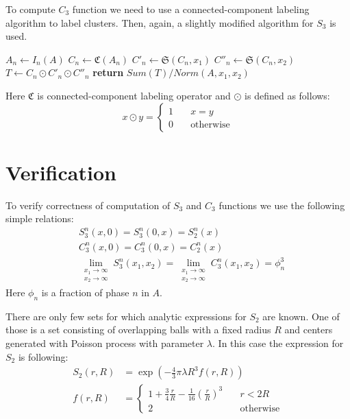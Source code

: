 \documentclass[1p]{elsarticle}
\begin{document}
To compute $C_3$ function we need to use a connected-component labeling
algorithm \cite{4728561,PhysRevB.14.3438} to label clusters. Then, again, a
slightly modified algorithm for $S_3$ is used.
\begin{algorithmic}[1]
  \State $A_n \gets I_n (A)$
  \State $C_n \gets \mathfrak{C}(A_n)$
  \State $C'_n \gets \mathfrak{S}(C_n, x_1)$
  \State $C''_n \gets \mathfrak{S}(C_n, x_2)$
  \State $T \gets C_n \odot C'_n \odot C''_n$
  \State \textbf{return} $Sum(T) / Norm(A, x_1, x_2)$
  \EndProcedure
\end{algorithmic}
Here $\mathfrak{C}$ is connected-component labeling operator and $\odot$ is
defined as follows:
\begin{equation}
  x \odot y = \left\{
  \begin{array}{ll}
    1 & \quad x = y \\
    0 & \quad \text{otherwise}
  \end{array}
  \right.
\end{equation}

\section{Verification}
To verify correctness of computation of $S_3$ and $C_3$ functions we use the
following simple relations:
\begin{align}
  & S_3^n (x, 0) = S_3^n (0, x) = S_2^n(x) \\
  & C_3^n (x, 0) = C_3^n (0, x) = C_2^n(x) \\
  & \lim_{\substack{x_1 \to \infty \\ x_2 \to \infty}} S_3^n (x_1, x_2) =
  \lim_{\substack{x_1 \to \infty \\ x_2 \to \infty}} C_3^n (x_1, x_2) = \phi_n^3
\end{align}
Here $\phi_n$ is a fraction of phase $n$ in $A$.

There are only few sets for which analytic expressions for $S_2$ are known. One
of those is a set consisting of overlapping balls with a fixed radius $R$ and
centers generated with Poisson process with parameter $\lambda$. In this case
the expression for $S_2$ is following:
\begin{equation}
  \begin{aligned}
    S_2(r, R) &= \exp(-\frac{4}{3}\pi\lambda R^3 f(r, R)) \\
    f(r, R) &= \left\{
    \begin{array}{ll}
      1 + \frac{3}{4} \frac{r}{R} - \frac{1}{16} (\frac{r}{R})^3 & \quad r < 2R \\
      2 & \quad \text{otherwise}
    \end{array}
    \right.
  \end{aligned}
  \label{eq:s2-balls}
\end{equation}
\end{document}
